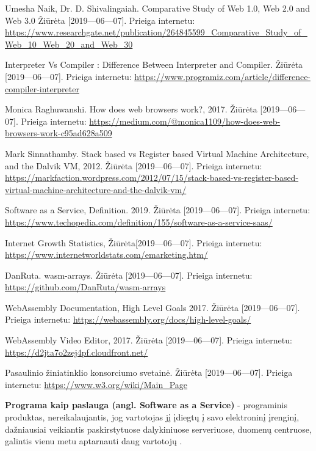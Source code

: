 \documentclass{VUMIFPSkursinis}
\begin{document}
\begin{thebibliography}{99}
Umesha Naik, Dr. D. Shivalingaiah. Comparative Study of Web 1.0, Web 2.0 and Web 3.0  Žiūrėta [2019—06—07]. Prieiga internetu: \url{https://www.researchgate.net/publication/264845599_Comparative_Study_of_Web_10_Web_20_and_Web_30}

Interpreter Vs Compiler : Difference Between Interpreter and Compiler. Žiūrėta [2019—06—07]. Prieiga internetu: \url{https://www.programiz.com/article/difference-compiler-interpreter}

Monica Raghuwanshi. How does web browsers work?, 2017. Žiūrėta [2019—06—07]. Prieiga internetu: \url{https://medium.com/@monica1109/how-does-web-browsers-work-c95ad628a509}

Mark Sinnathamby. Stack based vs Register based Virtual Machine Architecture, and the Dalvik VM, 2012. Žiūrėta [2019—06—07]. Prieiga internetu: \url{https://markfaction.wordpress.com/2012/07/15/stack-based-vs-register-based-virtual-machine-architecture-and-the-dalvik-vm/}

Software as a Service, Definition. 2019. Žiūrėta [2019—06—07]. Prieiga internetu: \url{https://www.techopedia.com/definition/155/software-as-a-service-saas/}

Internet Growth Statistics, Žiūrėta[2019—06—07]. Prieiga internetu: \url{https://www.internetworldstats.com/emarketing.htm/}

DanRuta. wasm-arrays. Žiūrėta [2019—06—07]. Prieiga internetu: \url{https://github.com/DanRuta/wasm-arrays}

WebAssembly Documentation, High Level Goals 2017. Žiūrėta [2019—06—07]. Prieiga internetu: \url{https://webassembly.org/docs/high-level-goals/}

WebAssembly Video Editor, 2017. Žiūrėta [2019—06—07]. Prieiga internetu: \url{https://d2jta7o2zej4pf.cloudfront.net/}

Pasaulinio žiniatinklio konsorciumo svetainė. Žiūrėta [2019—06—07]. Prieiga internetu: \url{https://www.w3.org/wiki/Main_Page}

\end{thebibliography}


\textbf{Programa kaip paslauga (angl. Software as a Service)} - programinis produktas, nereikalaujantis, jog vartotojas jį įdiegtų į savo elektroninį įrenginį, dažniausiai veikiantis paskirstytuose dalykiniuose serveriuose, duomenų centruose, galintis vienu metu aptarnauti daug vartotojų \cite{TEC19}.
\end{document}

